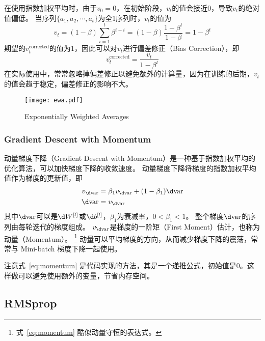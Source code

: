 在使用指数加权平均时，由于$v_0 = 0$，在初始阶段，$v_t$的值会接近0，导致$v_t$的绝对值偏低。
当序列$\{a_1, a_2, \cdots, a_t\}$为全1序列时，$v_t$的值为
\begin{equation}
    v_t = (1 - \beta)\sum_{i=1}^t\beta^{t-i} = (1 - \beta)\frac{1 - \beta^t}{1 - \beta} = 1 - \beta^t
\end{equation}
期望的$v_t^{\mathrm{corrected}}$的值为$1$，因此可以对$v_t$进行偏差修正（Bias Correction），即
\begin{equation}
    v_t^{\mathrm{corrected}} = \frac{v_t}{1 - \beta^t}
\end{equation}
在实际使用中，常常忽略掉偏差修正以避免额外的计算量，因为在训练的后期，$v_t$的值会趋于稳定，偏差修正的影响不大。

\begin{figure}[h!bt]
    \centering
    \texttt{[image: ewa.pdf]}
    \caption{Exponentially Weighted Averages}
    \label{fig:ewa}
\end{figure}

\subsubsection{Gradient Descent with Momentum}

动量梯度下降（Gradient Descent with Momentum）是一种基于指数加权平均的优化算法，可以加快梯度下降的收敛速度。
动量梯度下降将梯度的指数加权平均值作为梯度的更新值，即
\begin{equation}
    \begin{aligned}
        v_{\d \mathrm{var}} &= \beta_1 v_{\d \mathrm{var}} + (1 - \beta_1)\d \mathrm{var} \\
        \d \mathrm{var} &= v_{\d \mathrm{var}}
    \end{aligned}
    \label{eq:momentum}
\end{equation}
其中$\d \mathrm{var}$可以是$\d W^{[l]}$或$\d b^{[l]}$，$\beta_1$为衰减率，$0 < \beta_1 < 1$。
整个梯度$\d \mathrm{var}$的序列由每轮迭代的梯度组成。
$v_{\d \mathrm{var}}$是梯度的一阶矩（First Moment）估计，也称为动量（Momentum）。
\footnote{式~\eqref{eq:momentum} 酷似动量守恒的表达式。}
动量可以平均梯度的方向，从而减少梯度下降的震荡，常常与 Mini-batch 梯度下降一起使用。

注意式~\eqref{eq:momentum} 是代码实现的方法，其是一个递推公式，初始值是0。这样做可以避免使用额外的变量，节省内存空间。

\subsection{RMSprop}

